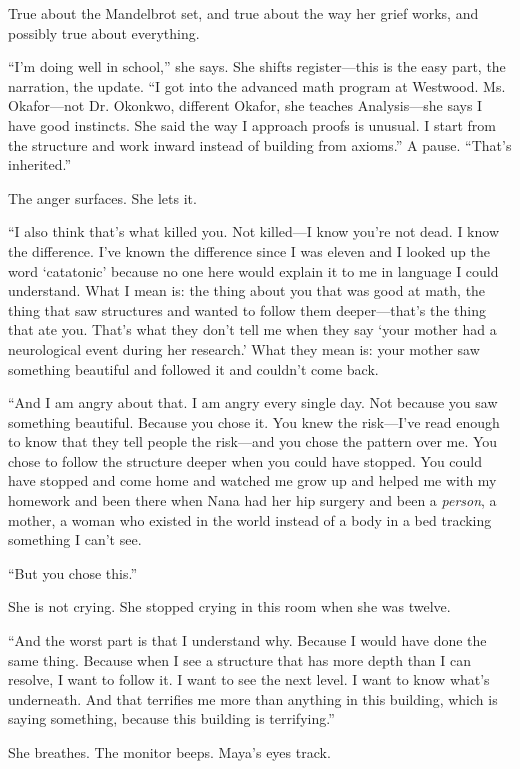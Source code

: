 True about the Mandelbrot set, and true about the way her grief works, and possibly true about everything.

``I'm doing well in school,'' she says. She shifts register---this is the easy part, the narration, the update. ``I got into the advanced math program at Westwood. Ms. Okafor---not Dr. Okonkwo, different Okafor, she teaches Analysis---she says I have good instincts. She said the way I approach proofs is unusual. I start from the structure and work inward instead of building from axioms.'' A pause. ``That's inherited.''

The anger surfaces. She lets it.

``I also think that's what killed you. Not killed---I know you're not dead. I know the difference. I've known the difference since I was eleven and I looked up the word `catatonic' because no one here would explain it to me in language I could understand. What I mean is: the thing about you that was good at math, the thing that saw structures and wanted to follow them deeper---that's the thing that ate you. That's what they don't tell me when they say `your mother had a neurological event during her research.' What they mean is: your mother saw something beautiful and followed it and couldn't come back.

``And I am angry about that. I am angry every single day. Not because you saw something beautiful. Because you chose it. You knew the risk---I've read enough to know that they tell people the risk---and you chose the pattern over me. You chose to follow the structure deeper when you could have stopped. You could have stopped and come home and watched me grow up and helped me with my homework and been there when Nana had her hip surgery and been a \textit{person}, a mother, a woman who existed in the world instead of a body in a bed tracking something I can't see.

``But you chose this.''

She is not crying. She stopped crying in this room when she was twelve.

``And the worst part is that I understand why. Because I would have done the same thing. Because when I see a structure that has more depth than I can resolve, I want to follow it. I want to see the next level. I want to know what's underneath. And that terrifies me more than anything in this building, which is saying something, because this building is terrifying.''

She breathes. The monitor beeps. Maya's eyes track.

